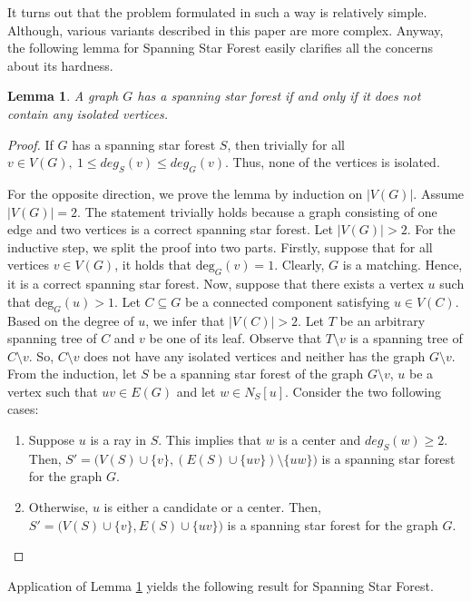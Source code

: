 \documentclass[en]{pracamgr}
\newtheorem{lemma}{Lemma}
\newcommand{\ssf}{spanning star forest}
\newcommand{\ssfp}{{\sc Spanning Star Forest}}
\newcommand{\degree}[2]{\textrm{deg}_{#1}(#2)}
\begin{document}
It turns out that the problem formulated in such a way is relatively simple. Although, various variants described in this paper are more complex. Anyway, the following lemma for \ssfp{} easily clarifies all the concerns about its hardness.

\begin{lemma}\label{SSF lemma}
 A graph $G$ has a \ssf{} if and only if it does not contain any isolated vertices.
\end{lemma}

\begin{proof}
	If $G$ has a \ssf{} $S$, then trivially for all $v \in V(G),\ 1 \leq deg_S(v) \leq deg_G(v)$. Thus, none of the vertices is isolated.
	
	For the opposite direction, we prove the lemma by induction on $|V(G)|$. Assume $|V(G)|=2$. The statement trivially holds because a graph consisting of one edge and two vertices is a correct \ssf{}. Let $|V(G)| >2$. For the inductive step, we split the proof into two parts. Firstly, suppose that for all vertices $v \in V(G)$, it holds that $\degree{G}{v}=1$.  Clearly, $G$ is a matching. Hence, it is a correct \ssf{}. Now, suppose that there exists a vertex $u$ such that $\degree{G}{u}>1$. Let $C \subseteq G$ be a connected component satisfying $u \in V(C)$. Based on the degree of $u$, we infer that $|V(C)|>2$. Let $T$ be an arbitrary spanning tree of $C$ and $v$ be one of its leaf. Observe that $T \setminus v$ is a spanning tree of $C \setminus v$. So, $C \setminus v$ does not have any isolated vertices and neither has the graph $G \setminus v$. From the induction, let $S$ be a \ssf{} of the graph $G \setminus v$, $u$ be a vertex such that $uv \in E(G)$ and let $w \in N_S[u]$. Consider the two following cases:
	\begin{enumerate}
		\item Suppose $u$ is a ray in $S$. This implies that $w$ is a center and $deg_S(w) \geq 2$. Then, $S'=\big(V(S) \cup \{v\},(E(S) \cup \{uv\}) \setminus \{uw\}\big)$ is a spanning star forest for the graph $G$.
		\item Otherwise, $u$ is either a candidate or a center. Then, $S'=\big(V(S) \cup \{v\}, E(S) \cup \{uv\}\big)$ is a spanning star forest for the graph $G$.
	\end{enumerate}
	
\end{proof}

Application of Lemma \ref{SSF lemma} yields the following result for \ssfp{}.
\end{document}
